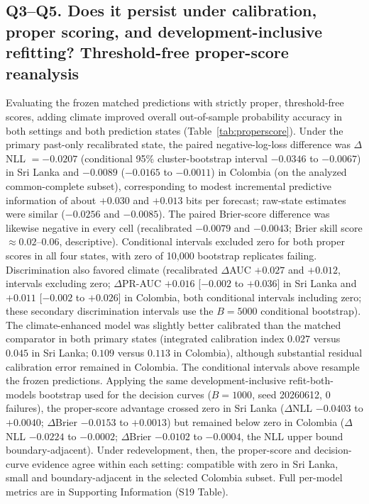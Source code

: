 \documentclass[11pt,a4paper]{article}
\begin{document}
\subsection{Q3--Q5. Does it persist under calibration, proper scoring, and development-inclusive refitting? Threshold-free proper-score reanalysis}
Evaluating the frozen matched predictions with strictly proper, threshold-free scores, adding climate improved overall out-of-sample probability accuracy in both settings and both prediction states (Table~\ref{tab:properscore}). Under the primary past-only recalibrated state, the paired negative-log-loss difference was $\Delta$NLL $=-0.0207$ (conditional 95\% cluster-bootstrap interval $-0.0346$ to $-0.0067$) in Sri Lanka and $-0.0089$ ($-0.0165$ to $-0.0011$) in Colombia (on the analyzed common-complete subset), corresponding to modest incremental predictive information of about $+0.030$ and $+0.013$ bits per forecast; raw-state estimates were similar ($-0.0256$ and $-0.0085$). The paired Brier-score difference was likewise negative in every cell (recalibrated $-0.0079$ and $-0.0043$; Brier skill score $\approx0.02$--$0.06$, descriptive). Conditional intervals excluded zero for both proper scores in all four states, with zero of 10{,}000 bootstrap replicates failing. Discrimination also favored climate (recalibrated $\Delta$AUC $+0.027$ and $+0.012$, intervals excluding zero; $\Delta$PR-AUC $+0.016$ [$-0.002$ to $+0.036$] in Sri Lanka and $+0.011$ [$-0.002$ to $+0.026$] in Colombia, both conditional intervals including zero; these secondary discrimination intervals use the $B=5000$ conditional bootstrap). The climate-enhanced model was slightly better calibrated than the matched comparator in both primary states (integrated calibration index $0.027$ versus $0.045$ in Sri Lanka; $0.109$ versus $0.113$ in Colombia), although substantial residual calibration error remained in Colombia. The conditional intervals above resample the frozen predictions. Applying the same development-inclusive refit-both-models bootstrap used for the decision curves ($B=1000$, seed 20260612, 0 failures), the proper-score advantage crossed zero in Sri Lanka ($\Delta$NLL $-0.0403$ to $+0.0040$; $\Delta$Brier $-0.0153$ to $+0.0013$) but remained below zero in Colombia ($\Delta$NLL $-0.0224$ to $-0.0002$; $\Delta$Brier $-0.0102$ to $-0.0004$, the NLL upper bound boundary-adjacent). Under redevelopment, then, the proper-score and decision-curve evidence agree within each setting: compatible with zero in Sri Lanka, small and boundary-adjacent in the selected Colombia subset. Full per-model metrics are in Supporting Information (S19 Table).
\end{document}
